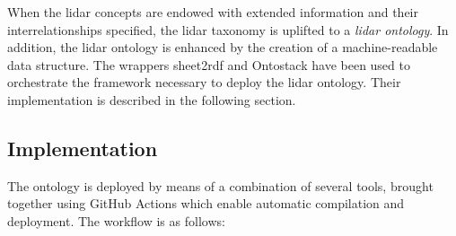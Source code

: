 \documentclass[remotesensing,article,submit,pdftex,moreauthors]{Definitions/mdpi}
\begin{document}
When the lidar concepts are endowed with extended information and their interrelationships specified, the lidar taxonomy is uplifted to a {\it lidar ontology}.
In addition, the lidar ontology is enhanced by the creation of a machine-readable data structure.
The wrappers sheet2rdf \cite{ref-Fiorelli2015} and Ontostack \cite{ref-OntoStack} have been used to orchestrate the framework necessary to deploy the lidar ontology. Their implementation is described in the following section.

\subsection{Implementation}
\label{subsec:implementation}
The ontology is deployed by means of a combination of several tools, brought together using GitHub Actions which enable automatic compilation and deployment. The workflow is as follows: 
\end{document}
